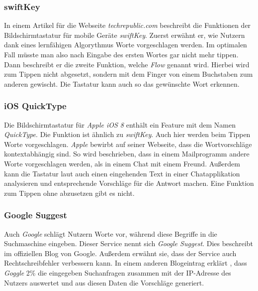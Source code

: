         \subsubsection*{swiftKey}
        	In einem Artikel für die Webseite \emph{techrepublic.com} beschreibt \cite{techrepublic:swiftKey} die Funktionen der Bildschirmtastatur für mobile Geräte \emph{swiftKey}. Zuerst erwähnt er, wie Nutzern dank eines lernfähigen Algorythmus Worte vorgeschlagen werden. Im optimalen Fall müsste man also nach Eingabe des ersten Wortes gar nicht mehr tippen. Dann beschreibt er die zweite Funktion, welche \emph{Flow} genannt wird. Hierbei wird zum Tippen nicht abgesetzt, sondern mit dem Finger von einem Buchstaben zum anderen gewischt. Die Tastatur kann auch so das gewünschte Wort erkennen.
        
        
        \subsubsection*{iOS QuickType}
        
        	Die Bildschirmtastatur für \emph{Apple iOS 8} enthält ein Feature mit dem Namen \emph{QuickType}. Die Funktion ist ähnlich zu \emph{swiftKey}. Auch hier werden beim Tippen Worte vorgeschlagen. \emph{Apple} bewirbt auf seiner Webseite, dass die Wortvorschläge kontextabhängig sind. So wird beschrieben, dass in einem Mailprogramm andere Worte vorgeschlagen werden, als in einem Chat mit einem Freund. Außerdem kann die Tastatur laut \cite{apple:quickType} auch einen eingehenden Text in einer Chatapplikation analysieren und entsprechende Vorschläge für die Antwort machen. Eine Funktion zum Tippen ohne abzusetzen gibt es nicht.
        
        \subsubsection*{Google Suggest}
        
        	Auch \emph{Google} schlägt Nutzern Worte vor, während diese Begriffe in die Suchmaschine eingeben. Dieser Service nennt sich \emph{Google Suggest}. Dies beschreibt \cite{google:suggestIntro} im offiziellen Blog von Google. Außerdem erwähnt sie, dass der Service auch Rechtschreibfehler verbessern kann. In einem anderen Blogeintrag erklärt \cite{google:suggestUpdate}, dass \emph{Goggle} 2\% die eingegeben Suchanfragen zusammen mit der IP-Adresse des Nutzers auswertet und aus diesen Daten die Vorschläge generiert.
    
    
    
    \newpage